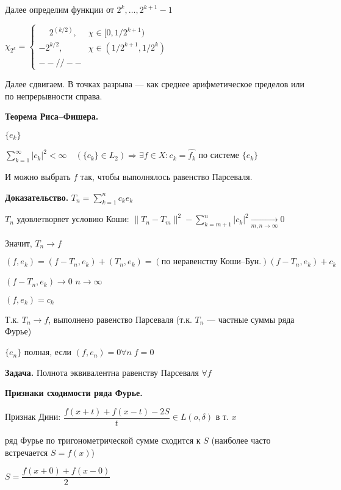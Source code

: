 Далее определим функции от $2^k, \ldots, 2^{k+1} - 1$


$\chi_{2^k} =
\begin{cases}
\phantom{-}2^(k/2), &\text{$\chi \in [0, 1/2^{k+1})$}\\
-2^{k/2}, &\text{$\chi \in (1/2^{k+1}, 1/2^k)$}\\
-- // --
\end{cases} $

Далее сдвигаем. В точках разрыва --- как среднее арифметическое
пределов или по непрерывности справа.

\textbf{Теорема Риса--Фишера.} \quad

$\{e_k\}$

$\sum_{k=1}^\infty |c_k|^2 < \infty \quad (\{c_k\} \in L_2)
\Rightarrow \exists f \in X : c_k = \hat{f_k}$ по системе
$\{e_k\}$

И можно выбрать $f$ так, чтобы выполнялось равенство Парсеваля.

\textbf{Доказательство.} \quad $T_n = \sum_{k=1}^n c_k e_k$

$T_n$ удовлетворяет условию Коши:  $\|T_n - T_m\|^2 -
\sum_{k=m+1}^n |c_k|^2 \xrightarrow[m, n \rightarrow \infty]{} 0$

Значит, $T_n \rightarrow f$

$(f, e_k) = (f - T_n, e_k) + (T_n, e_k) = (\text{по неравенству
Коши--Бун.}) (f - T_n, e_k) + c_k$

$(f - T_n, e_k) \rightarrow 0$ $n \rightarrow \infty$

$(f, e_k) = c_k$

Т.к. $T_n \rightarrow f$, выполнено равенство Парсеваля (т.к.
$T_n$ --- частные суммы ряда Фурье)

$\{e_n\}$ полная, если $(f,e_n) = 0 \forall n \; f = 0$

\textbf{Задача.} \quad Полнота эквивалентна равенству Парсеваля
$\forall f$

\textbf{Признаки сходимости ряда Фурье.} \quad

Признак Дини:  $\dfrac{f(x+t) + f(x-t) - 2S}{t} \in L(o, \delta)$
в т. $x$

ряд Фурье по тригонометрической сумме сходится к $S$ (наиболее
часто встречается  $S = f(x)$)

 $S = \dfrac{f(x+0) + f(x-0)}{2}$
